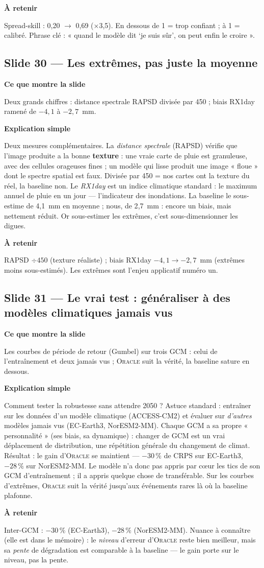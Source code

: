 \documentclass[11pt,a4paper]{article}
\newcommand{\slide}[2]{\subsection*{\textcolor{bleu}{Slide #1 --- #2}}}
\newcommand{\bloc}[1]{\par\medskip\noindent\textcolor{accent}{\textbf{#1}}\par\nopagebreak\smallskip}
\begin{document}
\bloc{À retenir}
Spread-skill : 0{,}20 $\to$ 0{,}69 ($\times$3,5). En dessous de 1 = trop confiant ; à 1 = calibré. Phrase clé : « quand le modèle dit `je suis sûr', on peut enfin le croire ».

\slide{30}{Les extrêmes, pas juste la moyenne}

\bloc{Ce que montre la slide}
Deux grands chiffres : distance spectrale RAPSD divisée par 450 ; biais RX1day ramené de $-4{,}1$ à $-2{,}7$~mm.

\bloc{Explication simple}
Deux mesures complémentaires. La \emph{distance spectrale} (RAPSD) vérifie que l'image produite a la bonne \textbf{texture} : une vraie carte de pluie est granuleuse, avec des cellules orageuses fines ; un modèle qui lisse produit une image « floue » dont le spectre spatial est faux. Divisée par 450 = nos cartes ont la texture du réel, la baseline non. Le \emph{RX1day} est un indice climatique standard : le maximum annuel de pluie en un jour --- l'indicateur des inondations. La baseline le sous-estime de 4{,}1~mm en moyenne ; nous, de 2{,}7~mm : encore un biais, mais nettement réduit. Or sous-estimer les extrêmes, c'est sous-dimensionner les digues.

\bloc{À retenir}
RAPSD $\div 450$ (texture réaliste) ; biais RX1day $-4{,}1 \to -2{,}7$~mm (extrêmes moins sous-estimés). Les extrêmes sont l'enjeu applicatif numéro un.

\slide{31}{Le vrai test : généraliser à des modèles climatiques jamais vus}

\bloc{Ce que montre la slide}
Les courbes de période de retour (Gumbel) sur trois GCM : celui de l'entraînement et deux jamais vus ; \textsc{Oracle} suit la vérité, la baseline sature en dessous.

\bloc{Explication simple}
Comment tester la robustesse sans attendre 2050 ? Astuce standard : entraîner sur les données d'\emph{un} modèle climatique (ACCESS-CM2) et évaluer sur \emph{d'autres} modèles jamais vus (EC-Earth3, NorESM2-MM). Chaque GCM a sa propre « personnalité » (ses biais, sa dynamique) : changer de GCM est un vrai déplacement de distribution, une répétition générale du changement de climat. Résultat : le gain d'\textsc{Oracle} se maintient --- $-30\,\%$ de CRPS sur EC-Earth3, $-28\,\%$ sur NorESM2-MM. Le modèle n'a donc pas appris par c\oe ur les tics de son GCM d'entraînement ; il a appris quelque chose de transférable. Sur les courbes d'extrêmes, \textsc{Oracle} suit la vérité jusqu'aux événements rares là où la baseline plafonne.

\bloc{À retenir}
Inter-GCM : $-30\,\%$ (EC-Earth3), $-28\,\%$ (NorESM2-MM). Nuance à connaître (elle est dans le mémoire) : le \emph{niveau} d'erreur d'\textsc{Oracle} reste bien meilleur, mais sa \emph{pente} de dégradation est comparable à la baseline --- le gain porte sur le niveau, pas la pente.
\end{document}
